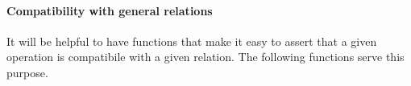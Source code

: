\paragraph*{Compatibility with general relations}
It will be helpful to have functions that make it easy to assert that a given operation is compatibile with a given relation. The following functions serve this purpose.
\ccpad
\begin{code}%
\>[0][@{}l@{\AgdaIndent{0}}]%
\>[1]\AgdaSpace{}%
\AgdaSymbol{:}\AgdaSpace{}%
\AgdaSpace{}%
\AgdaSpace{}%
\AgdaSpace{}%
\AgdaSpace{}%
\AgdaSpace{}%
\AgdaSymbol{(}\AgdaSpace{}%
\AgdaSpace{}%
\AgdaSpace{}%
\AgdaSpace{}%
\AgdaSymbol{)}\AgdaSpace{}%
\AgdaSpace{}%
\AgdaSpace{}%
\AgdaSpace{}%
\AgdaSpace{}%
\<%
\\
%
\>[1]\AgdaSpace{}%
\AgdaSpace{}%
\AgdaSpace{}%
\AgdaSymbol{=}\AgdaSpace{}%
\AgdaSpace{}%
\AgdaSpace{}%
\AgdaSpace{}%
\AgdaSpace{}%
\AgdaFunction{,}\AgdaSpace{}%
\AgdaSpace{}%
\AgdaSpace{}%
\AgdaSpace{}%
\AgdaSpace{}%
\AgdaSpace{}%
\AgdaSpace{}%
\<%
\\
%
\\[\AgdaEmptyExtraSkip]%
%
\>[1]\AgdaSpace{}%
\AgdaSymbol{:}\AgdaSpace{}%
\AgdaSpace{}%
\AgdaSpace{}%
\AgdaSpace{}%
\AgdaSpace{}%
\AgdaSpace{}%
\AgdaSpace{}%
\AgdaSpace{}%
\AgdaSpace{}%
\AgdaSpace{}%
\AgdaSpace{}%

\end{code}
